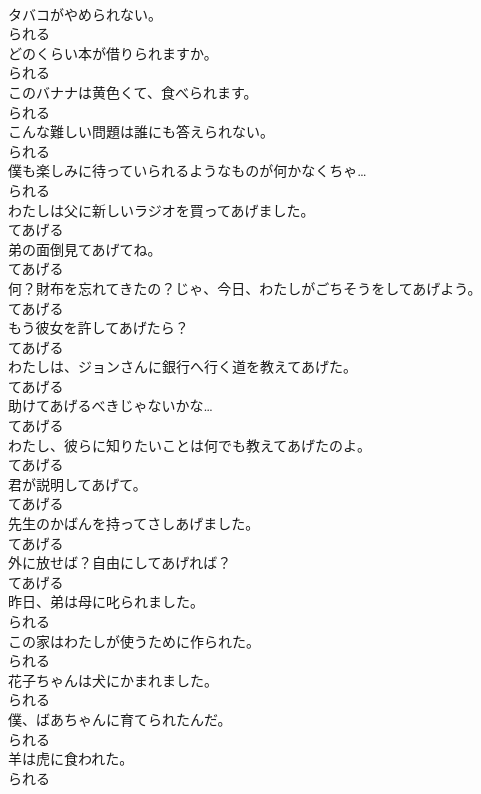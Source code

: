\documentclass[8pt]{extreport}
\begin{document}
\begin{CJK}{UTF8}{min}
\\	タバコがやめられない。	
\\	られる
\\	どのくらい本が借りられますか。	
\\	られる
\\	このバナナは黄色くて、食べられます。	
\\	られる
\\	こんな難しい問題は誰にも答えられない。	
\\	られる
\\	僕も楽しみに待っていられるようなものが何かなくちゃ…	
\\	られる
\\	わたしは父に新しいラジオを買ってあげました。	
\\	てあげる
\\	弟の面倒見てあげてね。	
\\	てあげる
\\	何？財布を忘れてきたの？じゃ、今日、わたしがごちそうをしてあげよう。	
\\	てあげる
\\	もう彼女を許してあげたら？	
\\	てあげる
\\	わたしは、ジョンさんに銀行へ行く道を教えてあげた。	
\\	てあげる
\\	助けてあげるべきじゃないかな…	
\\	てあげる
\\	わたし、彼らに知りたいことは何でも教えてあげたのよ。	
\\	てあげる
\\	君が説明してあげて。	
\\	てあげる
\\	先生のかばんを持ってさしあげました。	
\\	てあげる
\\	外に放せば？自由にしてあげれば？	
\\	てあげる
\\	昨日、弟は母に叱られました。	
\\	られる
\\	この家はわたしが使うために作られた。	
\\	られる
\\	花子ちゃんは犬にかまれました。	
\\	られる
\\	僕、ばあちゃんに育てられたんだ。	
\\	られる
\\	羊は虎に食われた。	
\\	られる

\end{CJK}
\end{document}

